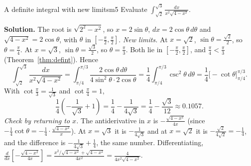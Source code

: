 \documentclass[11pt]{article}
\begin{document}
\begin{exmp}{A definite integral with new limits}{m5}
Evaluate $\displaystyle\int_{\sqrt2}^{\sqrt3}\frac{dx}{x^2\sqrt{4-x^2}}$.

\textbf{Solution.} The root is $\sqrt{2^2-x^2}$, so $x=2\sin\theta$, $dx=2\cos\theta\,d\theta$ and $\sqrt{4-x^2}=2\cos\theta$, with $\theta$ in $\left[-\frac\pi2,\frac\pi2\right]$. \emph{New limits.} At $x=\sqrt2$, $\sin\theta=\frac{\sqrt2}2$, so $\theta=\frac\pi4$. At $x=\sqrt3$, $\sin\theta=\frac{\sqrt3}2$, so $\theta=\frac\pi3$. Both lie in $\left[-\frac\pi2,\frac\pi2\right]$, and $\frac\pi4<\frac\pi3$ (Theorem~\ref{thm:defint}). Hence
\[\int_{\sqrt2}^{\sqrt3}\frac{dx}{x^2\sqrt{4-x^2}}=\int_{\pi/4}^{\pi/3}\frac{2\cos\theta\,d\theta}{4\sin^2\theta\cdot2\cos\theta}=\frac14\int_{\pi/4}^{\pi/3}\csc^2\theta\,d\theta=\frac14\Big[-\cot\theta\Big]_{\pi/4}^{\pi/3} .\]
With $\cot\frac\pi3=\frac1{\sqrt3}$ and $\cot\frac\pi4=1$,
\[\frac14\left(-\frac1{\sqrt3}+1\right)=\frac14-\frac1{4\sqrt3}=\frac14-\frac{\sqrt3}{12}\approx0.1057 .\]
\emph{Check by returning to $x$.} The antiderivative in $x$ is $-\frac{\sqrt{4-x^2}}{4x}$ (since $-\frac14\cot\theta=-\frac14\cdot\frac{\sqrt{4-x^2}}x$). At $x=\sqrt3$ it is $-\frac1{4\sqrt3}$ and at $x=\sqrt2$ it is $-\frac{\sqrt2}{4\sqrt2}=-\frac14$, and the difference is $-\frac1{4\sqrt3}+\frac14$, the same number. Differentiating, $\frac{d}{dx}\left[-\frac{\sqrt{4-x^2}}{4x}\right]=\frac{x^2/\sqrt{4-x^2}+\sqrt{4-x^2}}{4x^2}=\frac{4}{4x^2\sqrt{4-x^2}}$.
\end{exmp}
\end{document}
